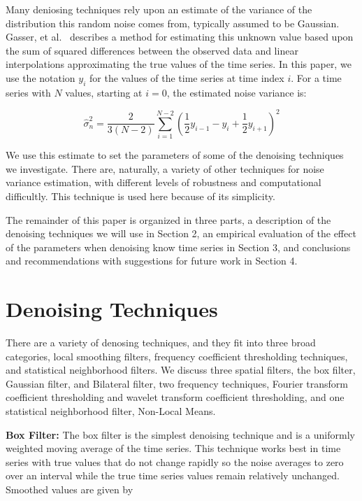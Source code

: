 \documentclass[11pt]{article}
\newcommand{\vs}{\vspace{0.1in}}
\theoremstyle{definition}
\begin{document}
Many deniosing techniques rely upon an estimate of the variance of the distribution this random noise comes from, typically assumed to be Gaussian. Gasser, et al.~\cite{Gasser86} describes a method for estimating this unknown value based upon the sum of squared differences between the observed data and linear interpolations approximating the true values of the time series. In this paper, we use the notation $y_i$ for the values of the time series at time index $i$. For a time series with $N$ values, starting at $i = 0$, the estimated noise variance is:

\begin{displaymath}
\hat{\sigma} ^2_n = \frac{2}{3 \left( N - 2 \right)} \sum _{i = 1} ^{N - 2} \left( \frac{1}{2} y_{i - 1} - y_i + \frac{1}{2} y_{i + 1} \right) ^2
\end{displaymath}

We use this estimate to set the parameters of some of the denoising techniques we investigate. There are, naturally, a variety of other techniques for noise variance estimation, with different levels of robustness and computational difficultly. This technique is used here because of its simplicity.

The remainder of this paper is organized in three parts, a description of the denoising techniques we will use in Section 2, an empirical evaluation of the effect of the parameters when denoising know time series in Section 3, and conclusions and recommendations with suggestions for future work in Section 4.


\section{Denoising Techniques}

There are a variety of denosing techniques, and they fit into three broad categories, local smoothing filters, frequency coefficient thresholding techniques, and statistical neighborhood filters. We discuss three spatial filters, the box filter, Gaussian filter, and Bilateral filter, two frequency techniques, Fourier transform coefficient thresholding and wavelet transform coefficient thresholding, and one statistical neighborhood filter, Non-Local Means.

\vs
\noindent
\textbf{Box Filter:} The box filter is the simplest denoising technique and is a uniformly weighted moving average of the time series. This technique works best in time series with true values that do not change rapidly so the noise averages to zero over an interval while the true time series values remain relatively unchanged. Smoothed values are given by
\end{document}
